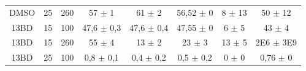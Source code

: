 \begin{table}[h]
{\begin{tabular}{c c c | c c c c c}
			  DMSO    & 25         & 260        & 57      \(\pm\) 1   & 61       \(\pm\) 2   & 56,52    \(\pm\) 0   & 8           \(\pm\) 13  & 50          \(\pm\) 12  \\ 
			  13BD    & 15         & 100        & 47,6    \(\pm\) 0,3 & 47,6     \(\pm\) 0,4 & 47,55    \(\pm\) 0   & 6           \(\pm\) 5   & 43          \(\pm\) 4   \\
			  13BD    & 15         & 260        & 55      \(\pm\) 4   & 13       \(\pm\) 2   & 23       \(\pm\) 3   & 13          \(\pm\) 5   & 2E6       \(\pm\) 3E9   \\
			  13BD    & 25         & 100        & 0,8     \(\pm\) 0,1 & 0,4      \(\pm\) 0,2 & 0,5      \(\pm\) 0,2 & 0           \(\pm\) 0   & 0,76        \(\pm\) 0   \\ \bottomrule
		\end{tabular}
	}{}
\end{table} 

